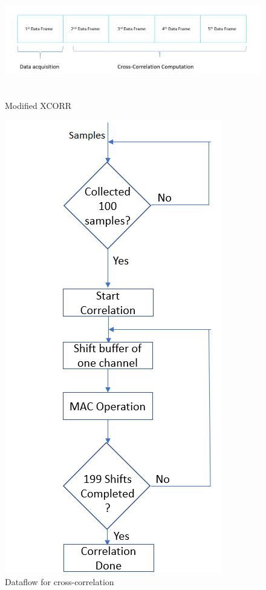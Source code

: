 \documentclass[BTech]{nitkdiss}
\begin{document}
\begin{figure}
    \centering
    \includegraphics[width = \textwidth, height = 5cm]{modified_xcorr.png}
    \caption{Modified XCORR}
    \label{fig:modxcorr}
\end{figure}
\begin{figure}[h!]
    \centering
    \includegraphics{xcorr_flow.png}
    \caption{Dataflow for cross-correlation}
    \label{fig:dataflow}
\end{figure}
\end{document}
